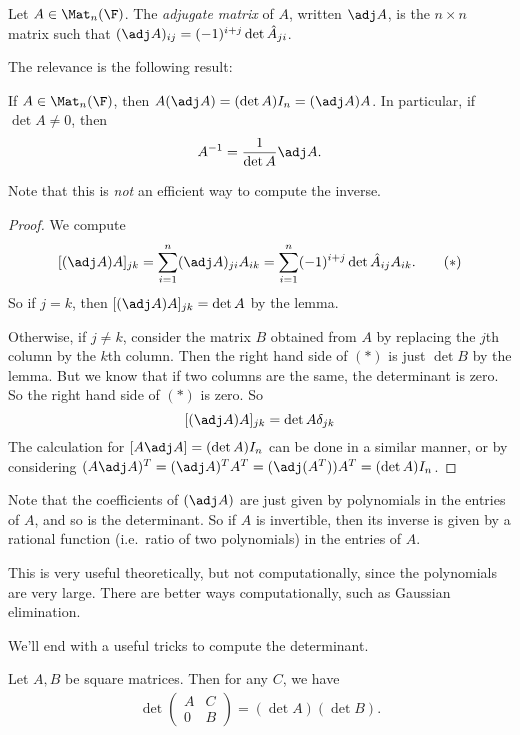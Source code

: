 \documentclass[a4paper]{article}
\begin{document}
\begin{defi}
  Let $A \in \Mat_n(\F)$. The \emph{adjugate matrix} of $A$, written $\adj A$, is the $n\times n$ matrix such that $(\adj A)_{ij} = (-1)^{i + j} \det\hat{A}_{ji}$.
\end{defi}

The relevance is the following result:
\begin{thm}
  If $A \in \Mat_n(\F)$, then $A(\adj A) = (\det A) I_n = (\adj A)A$. In particular, if $\det A \not= 0$, then
  \[
    A^{-1} = \frac{1}{\det A}\adj A.
  \]
\end{thm}
Note that this is \emph{not} an efficient way to compute the inverse.

\begin{proof}
  We compute
  \[
    [(\adj A)A]_{jk} = \sum_{i = 1}^n (\adj A)_{ji} A_{ik} = \sum_{i = 1}^n (-1)^{i + j} \det\hat{A}_{ij} A_{ik}.\tag{$*$}
  \]
  So if $j = k$, then $[(\adj A)A]_{jk} = \det A$ by the lemma.

  Otherwise, if $j \not= k$, consider the matrix $B$ obtained from $A$ by replacing the $j$th column by the $k$th column. Then the right hand side of $(*)$ is just $\det B$ by the lemma. But we know that if two columns are the same, the determinant is zero. So the right hand side of $(*)$ is zero. So
  \[
    [(\adj A)A]_{jk} = \det A \delta_{jk}
  \]
  The calculation for $[A\adj A] = (\det A) I_n$ can be done in a similar manner, or by considering $(A\adj A)^T = (\adj A)^T A^T = (\adj (A^T)) A^T = (\det A) I_n$.
\end{proof}
Note that the coefficients of $(\adj A)$ are just given by polynomials in the entries of $A$, and so is the determinant. So if $A$ is invertible, then its inverse is given by a rational function (i.e.\ ratio of two polynomials) in the entries of $A$.

This is very useful theoretically, but not computationally, since the polynomials are very large. There are better ways computationally, such as Gaussian elimination.

We'll end with a useful tricks to compute the determinant.
\begin{lemma}
  Let $A, B$ be square matrices. Then for any $C$, we have
  \begin{align*}
    \det
    \begin{pmatrix}
      A & C\\
      0 & B
    \end{pmatrix}
    = (\det A) (\det B).
  \end{align*}
\end{lemma}
\end{document}
